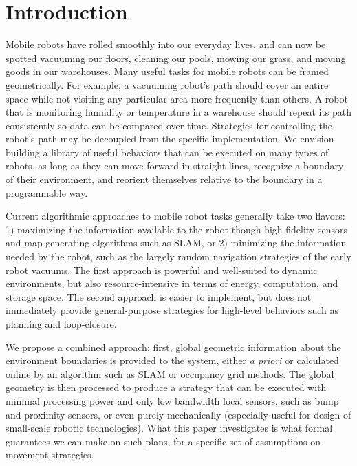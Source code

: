 \documentclass[]{article}
\begin{document}
\doublespacing

\section{Introduction}

Mobile robots have rolled smoothly into our everyday lives, and can now be
spotted vacuuming our floors, cleaning our pools, mowing our grass, and moving
goods in our warehouses. Many useful tasks for mobile robots can be framed
geometrically. For example, a 
vacuuming robot's path should cover an entire space while not visiting 
any particular area more frequently than others. A robot that is monitoring
humidity or temperature in a warehouse should repeat its path consistently so data 
can be compared over time. Strategies for controlling 
the robot's path may be decoupled from the specific implementation.
We envision building a library of useful behaviors that can be executed on many
types of robots, as long as they can move forward in straight lines, recognize a
boundary of their environment, and reorient themselves relative to the boundary in a
programmable way.

Current algorithmic approaches to mobile robot tasks generally take two flavors: 
1) maximizing
the information available to the robot though high-fidelity sensors and
map-generating algorithms such as SLAM, or 2) minimizing the information needed
by the robot, such as the largely random navigation strategies of the early
robot vacuums. The first approach is powerful and well-suited to dynamic
environments, but also resource-intensive in terms of energy, computation, and
storage space. The second approach is easier to implement, but does not
immediately provide general-purpose strategies for high-level behaviors such
as planning and loop-closure.

We propose a combined approach: first, global geometric information about the 
environment boundaries
is provided to the system, either \emph{a priori} or calculated online by an
algorithm such as SLAM or occupancy grid methods. The global geometry is then 
processed to produce a
strategy that can be executed with
minimal processing power and only low bandwidth local sensors, such as bump and
proximity sensors, or even purely mechanically (especially useful for design of
small-scale robotic technologies).
What this paper investigates is what formal guarantees we can make on such
plans, for a specific set of assumptions on movement strategies.
\end{document}
